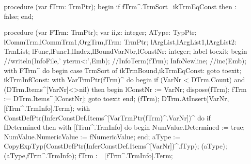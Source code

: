 procedure (var fTrm: TrmPtr);
begin
   if fTrm^.TrmSort=ikTrmEqConst then  := false;
end;

\eatline
{}\nwendcode{}\nwdocspar
\nwenddocs{}\endmoddef\nwstartdeflinemarkup{}\nwenddeflinemarkup
procedure (var FTrm: TrmPtr);
var
   ii,z: integer;
   AType: TypPtr;
   lCommTrm,lCommTrm1,OrgTrm,lTrm: TrmPtr;
   lArgList,lArgList1,lArgList2: TrmList;
   lFunc,lFunc1,lIndex,lBoundVarNbr,lConstNr: integer;
label toexit;
begin
   //writeln(InfoFile,'  yterm<:',Emb);
   //InfoTerm(fTrm); InfoNewline;
   //inc(Emb);
   with FTrm^ do
   begin
      case TrmSort of
         ikTrmBound,ikTrmEqConst: goto toexit;
         ikTrmInfConst:
            with VarTrmPtr(fTrm)^ do
         begin
            if (VarNr < DTrm.Count) and (DTrm.Items^[VarNr]<>nil) then
            begin
               lConstNr := VarNr;
               dispose(fTrm);
               fTrm := DTrm.Items^[lConstNr];
               goto toexit
            end;
            (fTrm);
            DTrm.AtInsert(VarNr,[fTrm^.TrmInfo].Term);
            with ConstDefPtr(InferConstDef.Items^[VarTrmPtr(fTrm)^.VarNr])^ do
               if fDetermined then
                  with [fTrm^.TrmInfo] do
               begin
                  NumValue.Determined := true;
                  NumValue.NumericValue := fNumericValue;
               end;
            aType := CopyExpTyp(ConstDefPtr(InferConstDef.Items^[VarNr])^.fTyp);
            (aType);
            (aType,fTrm^.TrmInfo);
            fTrm := [fTrm^.TrmInfo].Term;
